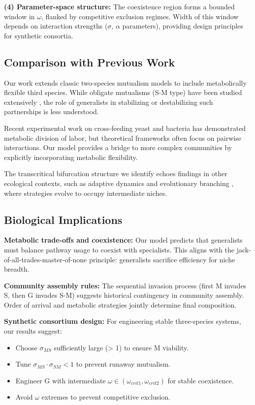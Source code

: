 \documentclass[11pt]{article}
\begin{document}
\textbf{(4) Parameter-space structure:} The coexistence region forms a bounded window in $\omega$, flanked by competitive exclusion regimes. Width of this window depends on interaction strengths ($\sigma$, $\alpha$ parameters), providing design principles for synthetic consortia.

\subsection{Comparison with Previous Work}

Our work extends classic two-species mutualism models \cite{may1973stability,holland2002consumer} to include metabolically flexible third species. While obligate mutualisms (S-M type) have been studied extensively \cite{bronstein2015mutualism}, the role of generalists in stabilizing or destabilizing such partnerships is less understood.

Recent experimental work on cross-feeding yeast \cite{shou2007synthetic,goldschmidt2017successive} and bacteria \cite{mee2014syntrophic,harcombe2014metabolic} has demonstrated metabolic division of labor, but theoretical frameworks often focus on pairwise interactions. Our model provides a bridge to more complex communities by explicitly incorporating metabolic flexibility.

The transcritical bifurcation structure we identify echoes findings in other ecological contexts, such as adaptive dynamics \cite{geritz1998evolutionarily} and evolutionary branching \cite{doebeli2003speciation}, where strategies evolve to occupy intermediate niches.

\subsection{Biological Implications}

\textbf{Metabolic trade-offs and coexistence:} Our model predicts that generalists must balance pathway usage to coexist with specialists. This aligns with the jack-of-all-trades-master-of-none principle: generalists sacrifice efficiency for niche breadth.

\textbf{Community assembly rules:} The sequential invasion process (first M invades S, then G invades S-M) suggests historical contingency in community assembly. Order of arrival and metabolic strategies jointly determine final composition.

\textbf{Synthetic consortium design:} For engineering stable three-species systems, our results suggest:
\begin{itemize}
\item Choose $\sigma_{MS}$ sufficiently large (> 1) to ensure M viability.
\item Tune $\sigma_{MS}\cdot\sigma_{SM} < 1$ to prevent runaway mutualism.
\item Engineer G with intermediate $\omega \in (\omega_{crit1}, \omega_{crit2})$ for stable coexistence.
\item Avoid $\omega$ extremes to prevent competitive exclusion.
\end{itemize}
\end{document}
